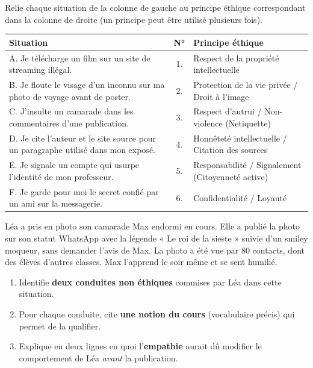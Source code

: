 \documentclass[11pt]{article}
\newcounter{popsec}
\newcounter{popsub}
\newcommand{\courssub}[1]{%
  \stepcounter{popsub}%
  \par\vspace{9pt}\noindent{\popxbold\fontsize{11.5}{13}\selectfont\color{popink}{\color{poporange}\thepopsec.\thepopsub}\hspace{6pt}#1}\par\nopagebreak\vspace{4pt}
}
\begin{document}
\begin{exercice}
Relie chaque situation de la colonne de gauche au principe éthique correspondant dans la colonne de droite (un principe peut être utilisé plusieurs fois).

\begin{center}
\begin{tabularx}{\linewidth}{|X|c|X|}\hline
\rowcolor{popblueL}\textbf{Situation} & \textbf{N°} & \textbf{Principe éthique} \\\hline
A. Je télécharge un film sur un site de streaming illégal. & 1. & Respect de la propriété intellectuelle \\\hline
B. Je floute le visage d'un inconnu sur ma photo de voyage avant de poster. & 2. & Protection de la vie privée / Droit à l'image \\\hline
C. J'insulte un camarade dans les commentaires d'une publication. & 3. & Respect d'autrui / Non-violence (Netiquette) \\\hline
D. Je cite l'auteur et le site source pour un paragraphe utilisé dans mon exposé. & 4. & Honnêteté intellectuelle / Citation des sources \\\hline
E. Je signale un compte qui usurpe l'identité de mon professeur. & 5. & Responsabilité / Signalement (Citoyenneté active) \\\hline
F. Je garde pour moi le secret confié par un ami sur la messagerie. & 6. & Confidentialité / Loyauté \\\hline
\end{tabularx}
\end{center}
\end{exercice}

\courssub{Je m'entraîne}

\begin{exercice}
Léa a pris en photo son camarade Max endormi en cours. Elle a publié la photo sur son statut WhatsApp avec la légende « Le roi de la sieste » suivie d'un smiley moqueur, sans demander l'avis de Max. La photo a été vue par 80 contacts, dont des élèves d'autres classes. Max l'apprend le soir même et se sent humilié.

\begin{enumerate}
\item Identifie \textbf{deux conduites non éthiques} commises par Léa dans cette situation.
\item Pour chaque conduite, cite \textbf{une notion du cours} (vocabulaire précis) qui permet de la qualifier.
\item Explique en deux lignes en quoi l'\textbf{empathie} aurait dû modifier le comportement de Léa \emph{avant} la publication.
\end{enumerate}
\end{exercice}
\end{document}
